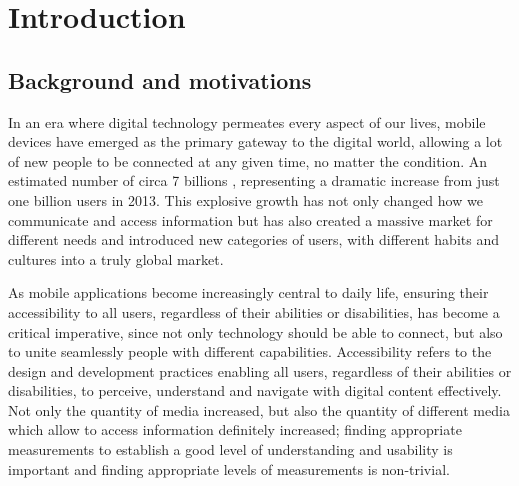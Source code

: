 \chapter{Introduction}
\label{chap:intro}

% 
% 
% 
% 
% 

\section{Background and motivations}
\label{chap:intro-background}

In an era where digital technology permeates every aspect of our lives, mobile devices have emerged as the primary gateway to the digital world, allowing a lot of new people to be connected at any given time, no matter the condition. An estimated number of circa 7 billions \cite{article:number-of-users}, representing a dramatic increase from just one billion users in 2013. This explosive growth has not only changed how we communicate and access information but has also created a massive market for different needs and introduced new categories of users, with different habits and cultures into a truly global market.

As mobile applications become increasingly central to daily life, ensuring their accessibility to all users, regardless of their abilities or disabilities, has become a critical imperative, since not only technology should be able to connect, but also to unite seamlessly people with different capabilities. Accessibility refers to the design and development practices enabling all users, regardless of their abilities or disabilities, to perceive, understand and navigate with digital content effectively. Not only the quantity of media increased, but also the quantity of different media which allow to access information definitely increased; finding appropriate measurements to establish a good level of understanding and usability is important and finding appropriate levels of measurements is non-trivial. \\

